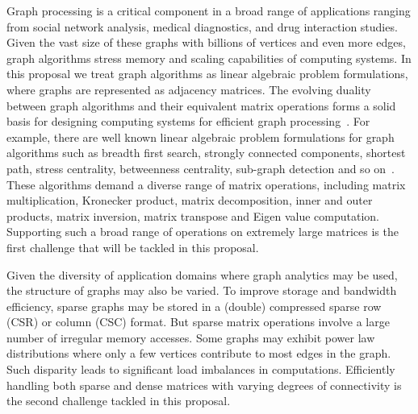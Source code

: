 \noindent
Graph processing is a critical component in a broad range of applications ranging from social network analysis, medical diagnostics, and drug interaction studies.  
Given the vast size of these graphs with billions of vertices and even more edges, graph algorithms stress memory and scaling capabilities of computing systems. 
In this proposal we treat graph algorithms as linear algebraic problem formulations, where graphs are represented as adjacency matrices.  
The evolving duality between graph algorithms and their equivalent matrix operations forms a solid basis for 
designing computing systems %
for efficient graph processing~\cite{graph:primitives}.
For example, there are well known linear algebraic problem formulations for graph algorithms such as breadth first search, strongly connected components, shortest path, stress centrality, betweenness centrality, sub-graph detection and so on~\cite{kepner2011graph}.  
These algorithms demand a diverse range of matrix operations, including matrix multiplication, Kronecker product,  matrix decomposition, inner and outer products, matrix inversion, matrix transpose and Eigen value computation.  
Supporting such a broad range of operations on extremely large matrices is the first challenge that will be tackled in this proposal. 


Given the diversity of application domains where graph analytics may be used, the structure of graphs may also be varied. 
To improve storage and bandwidth efficiency, sparse graphs may be stored in  a (double) compressed sparse row (CSR) or column (CSC) format. 
But sparse matrix operations involve a large number of irregular memory accesses.
Some graphs may exhibit power law distributions where only a few vertices contribute to most edges in the graph. 
Such disparity leads to significant load imbalances in computations.  
Efficiently handling both sparse and dense matrices with varying degrees of connectivity is the second challenge tackled in this proposal. 

